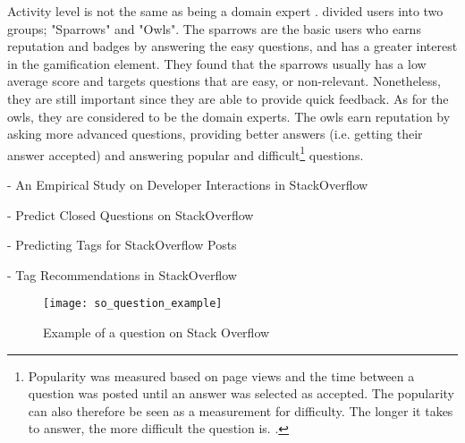 Activity level is not the same as being a domain expert \cite{Yang2014}. 
\textcite{Yang2014} divided users into two groups; "Sparrows" and "Owls".
The sparrows are the basic users who earns reputation and badges by answering the easy questions, and has a greater interest in the gamification element. 
They found that the sparrows usually has a low average score and targets questions that are easy, or non-relevant. 
Nonetheless, they are still important since they are able to provide quick feedback.
As for the owls, they are considered to be the domain experts.
The owls earn reputation by asking more advanced questions, providing better answers (i.e. getting their answer accepted) and answering popular and difficult\footnote{
	Popularity was measured based on page views and the time between a question was posted until an answer was selected as accepted.
	The popularity can also therefore be seen as a measurement for difficulty.
	The longer it takes to answer, the more difficult the question is. 
	 \cite[p.~273]{Yang2014}.
} questions.





\textcite{Wang2013} - An Empirical Study on Developer Interactions in StackOverflow

\textcite{Lezina2013} - Predict Closed Questions on StackOverflow

\textcite{Stanley2013} - Predicting Tags for StackOverflow Posts

\textcite{Short2014} - Tag Recommendations in StackOverflow


\begin{figure}[ht]
	\centering
	\texttt{[image: so\_question\_example]}
	\caption[Example of a question on Stack Overflow]{Example of a question on Stack Overflow\footnotemark}
	\label{fig:so_question_example}
\end{figure}


